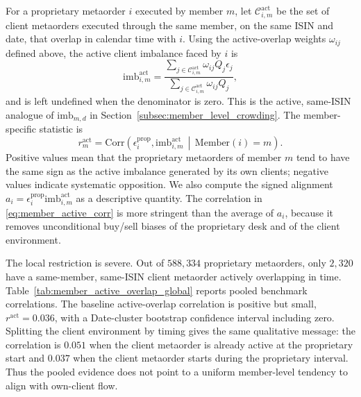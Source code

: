 \documentclass[11pt]{article}
\begin{document}
For a proprietary metaorder $i$ executed by member $m$, let
$\mathcal{C}^{\mathrm{act}}_{i,m}$ be the set of client metaorders executed
through the same member, on the same ISIN and date, that overlap in calendar
time with $i$. Using the active-overlap weights $\omega_{ij}$ defined above, the
active client imbalance faced by $i$ is
\begin{equation}
  \mathrm{imb}^{\mathrm{act}}_{i,m}
  =
  \frac{\sum_{j\in\mathcal{C}^{\mathrm{act}}_{i,m}}\omega_{ij}Q_j\epsilon_j}
       {\sum_{j\in\mathcal{C}^{\mathrm{act}}_{i,m}}\omega_{ij}Q_j},
  \label{eq:member_active_imbalance}
\end{equation}
and is left undefined when the denominator is zero. This is the active,
same-ISIN analogue of $\mathrm{imb}_{m,d}$ in
Section~\ref{subsec:member_level_crowding}. The member-specific statistic is
\begin{equation}
  r_m^{\mathrm{act}}
  =
  \mathrm{Corr}\!\left(
    \epsilon_i^{\mathrm{prop}},
    \mathrm{imb}^{\mathrm{act}}_{i,m}
    \,\middle|\, \mathrm{Member}(i)=m
  \right).
  \label{eq:member_active_corr}
\end{equation}
Positive values mean that the proprietary metaorders of member $m$ tend to have
the same sign as the active imbalance generated by its own clients; negative
values indicate systematic opposition. We also compute the signed alignment
$a_i=\epsilon_i^{\mathrm{prop}}\mathrm{imb}^{\mathrm{act}}_{i,m}$ as a
descriptive quantity. The correlation in \eqref{eq:member_active_corr} is more
stringent than the average of $a_i$, because it removes unconditional buy/sell
biases of the proprietary desk and of the client environment.

The local restriction is severe. Out of $588{,}334$ proprietary metaorders,
only $2{,}320$ have a same-member, same-ISIN client metaorder actively
overlapping in time. Table~\ref{tab:member_active_overlap_global} reports pooled
benchmark correlations. The baseline active-overlap correlation is positive but
small, $r^{\mathrm{act}}=0.036$, with a Date-cluster bootstrap confidence
interval including zero. Splitting the client environment by timing gives the
same qualitative message: the correlation is $0.051$ when the client metaorder
is already active at the proprietary start and $0.037$ when the client metaorder
starts during the proprietary interval. Thus the pooled evidence does not point
to a uniform member-level tendency to align with own-client flow.
\end{document}
